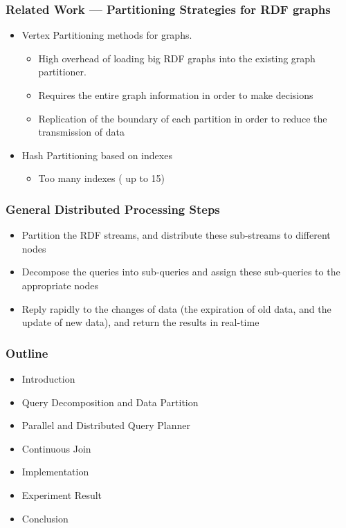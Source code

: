 \begin{frame}
\frametitle{Related Work --- Partitioning Strategies for RDF graphs}
\begin{itemize}
\item  Vertex Partitioning methods for graphs. 
\begin{itemize}
\item High overhead of loading big RDF graphs into the existing graph partitioner.
\item Requires the entire graph information in order to make decisions
\item Replication of the boundary of each partition in order to reduce the transmission of data
\end{itemize}
\item Hash Partitioning based on indexes
\begin{itemize}
\item Too many indexes ( up to 15)
\end{itemize}
\end{itemize}
\end{frame}



\begin{frame}
\frametitle{General Distributed Processing Steps}
\begin{itemize}
\item Partition the RDF streams, and distribute these sub-streams to different nodes
\item Decompose the queries into sub-queries and assign these sub-queries to the appropriate nodes
\item Reply rapidly to the changes of data (the expiration of old data, and the update of new data), and return the results in real-time
\end{itemize}
\end{frame}


\begin{frame}
\frametitle{Outline}
	\begin{itemize}
		\item Introduction
		\item Query Decomposition and Data Partition
		\item \textcolor{blue!20}{Parallel and Distributed Query Planner}
		\item \textcolor{blue!20}{Continuous Join}
		\item \textcolor{blue!20}{Implementation}
		\item \textcolor{blue!20}{Experiment Result}
		\item \textcolor{blue!20}{Conclusion}
	\end{itemize}
\end{frame}


